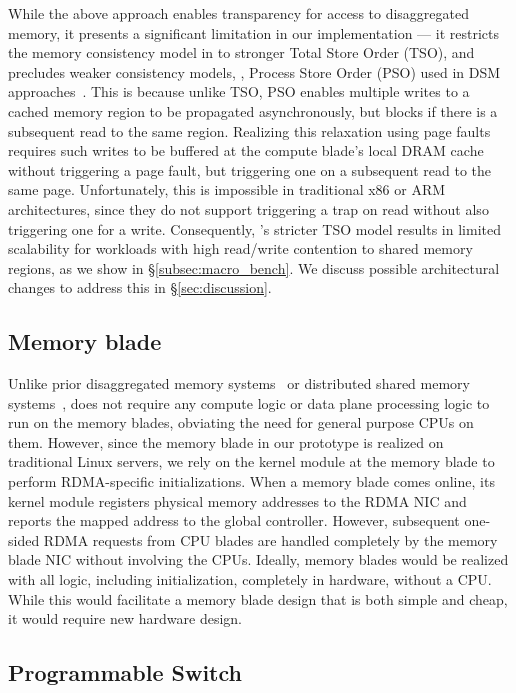 While the above approach enables transparency for access to disaggregated memory, it presents a significant limitation in our implementation --- it restricts the memory consistency model in \mind to stronger Total Store Order (TSO), and precludes weaker consistency models, \eg, Process Store Order (PSO) used in DSM approaches~\cite{gam}. This is because unlike TSO, PSO enables multiple writes to a cached memory region to be propagated asynchronously, but blocks if there is a subsequent read to the same region. Realizing this relaxation using page faults requires such writes to be buffered at the compute blade's local DRAM cache without triggering a page fault, but triggering one on a subsequent read to the same page. Unfortunately, this is impossible in traditional x86 or ARM architectures, since they do not support triggering a trap on read without also triggering one for a write. Consequently, \mind's stricter TSO model results in limited scalability for workloads with high read/write contention to shared memory regions, as we show in \S\ref{subsec:macro_bench}. We discuss possible architectural changes to address this in \S\ref{sec:discussion}.

\subsection{Memory blade} 

Unlike prior disaggregated memory systems~\cite{legoos, infiniswap} or distributed shared memory systems~\cite{gam}, \mind does not require any compute logic or data plane processing logic to run on the memory blades, obviating the need for general purpose CPUs on them. However, since the memory blade in our prototype is realized on traditional Linux servers, we rely on the kernel module at the memory blade to perform RDMA-specific initializations. When a memory blade comes online, its kernel module registers physical memory addresses to the RDMA NIC and reports the mapped address to the global controller. However, subsequent one-sided RDMA requests from CPU blades are handled completely by the memory blade NIC without involving the CPUs. Ideally, memory blades would be realized with all logic, including initialization, completely in hardware, without a CPU. While this would facilitate a memory blade design that is both simple and cheap, it would require new hardware design.

\subsection{Programmable Switch}
\label{ssec:switchimpl}

